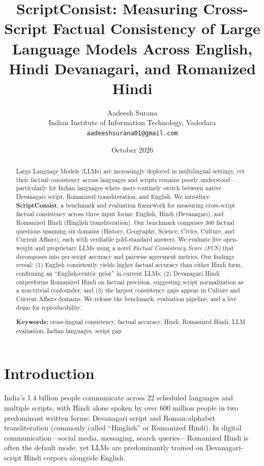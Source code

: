 \documentclass[11pt,a4paper]{article}
\title{\textbf{ScriptConsist: Measuring Cross-Script Factual Consistency of Large Language Models Across English, Hindi Devanagari, and Romanized Hindi}}
\author{
Aadeesh Surana \\
Indian Institute of Information Technology, Vadodara \\
\texttt{aadeeshsurana01@gmail.com}
}
\date{October 2026}
\begin{document}
\maketitle

\begin{abstract}
Large Language Models (LLMs) are increasingly deployed in multilingual settings, yet their factual consistency across languages and scripts remains poorly understood—particularly for Indian languages where users routinely switch between native Devanagari script, Romanized transliteration, and English. We introduce \textbf{ScriptConsist}, a benchmark and evaluation framework for measuring cross-script factual consistency across three input forms: English, Hindi (Devanagari), and Romanized Hindi (Hinglish transliteration). Our benchmark comprises 300 factual questions spanning six domains (History, Geography, Science, Civics, Culture, and Current Affairs), each with verifiable gold-standard answers. We evaluate five open-weight and proprietary LLMs using a novel \textit{Factual Consistency Score (FCS)} that decomposes into per-script accuracy and pairwise agreement metrics. Our findings reveal: (1) English consistently yields higher factual accuracy than either Hindi form, confirming an ``English-centric prior'' in current LLMs; (2) Devanagari Hindi outperforms Romanized Hindi on factual precision, suggesting script normalization as a non-trivial confounder; and (3) the largest consistency gaps appear in Culture and Current Affairs domains. We release the benchmark, evaluation pipeline, and a live demo for reproducibility.

\noindent\textbf{Keywords:} cross-lingual consistency, factual accuracy, Hindi, Romanized Hindi, LLM evaluation, Indian languages, script gap
\end{abstract}

\section{Introduction}
\label{sec:intro}

India's 1.4 billion people communicate across 22 scheduled languages and multiple scripts, with Hindi alone spoken by over 600 million people in two predominant written forms: Devanagari script and Roman-alphabet transliteration (commonly called ``Hinglish'' or Romanized Hindi). In digital communication—social media, messaging, search queries—Romanized Hindi is often the default mode, yet LLMs are predominantly trained on Devanagari-script Hindi corpora alongside English.
\end{document}
